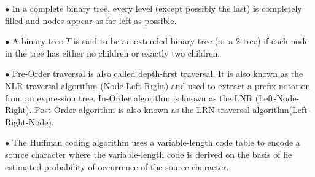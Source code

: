 \vskip 3mm
\qquad$\bullet$ In a complete binary tree, every level (except possibly the last) is completely filled and nodes appear as far left as possible.

\vskip 3mm
\qquad$\bullet$ A binary tree $T$ is said to be an extended binary tree (or a 2-tree) if each node in the tree has either no children or exactly two children.

\vskip 3mm
\qquad$\bullet$ Pre-Order traversal is also called depth-first traversal. It is also known as the NLR traversal algorithm (Node-Left-Right) and used to extract a prefix notation from an expression tree. In-Order algorithm is known as the LNR (Left-Node-Right). Post-Order algorithm is also known as the LRN traversal algorithm(Left-Right-Node).

\vskip 3mm
\qquad$\bullet$ The Huffman coding algorithm uses a variable-length code table to encode a source character where the variable-length code is derived on the basis of he estimated probability of occurrence of the source character.






\vfill\eject
\bye
